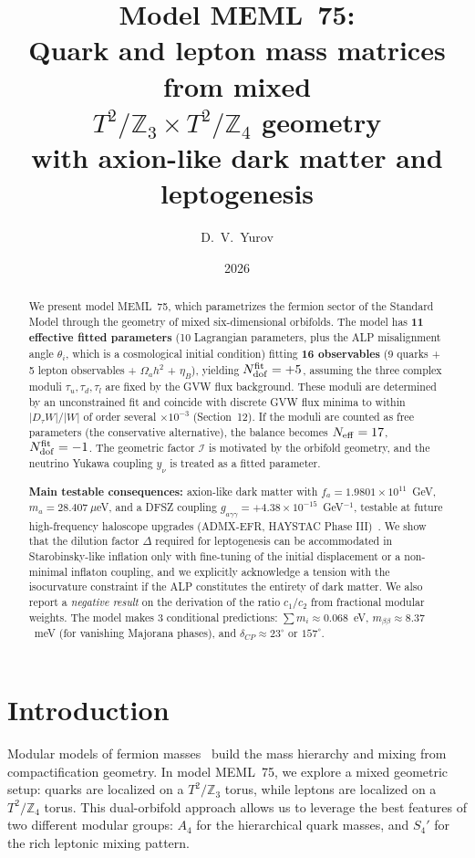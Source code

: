 \documentclass[12pt,a4paper]{article}
\title{\textbf{Model MEML~75:}\\[0.3cm]
\large Quark and lepton mass matrices from mixed \\
\(T^2/\mathbb{Z}_3 \times T^2/\mathbb{Z}_4\) geometry \\
with axion-like dark matter and leptogenesis}
\author{D.~V.~Yurov}
\date{2026}
\numberwithin{equation}{section}
\begin{document}
\maketitle

\begin{abstract}
\noindent
We present model MEML~75, which parametrizes the fermion sector of the Standard Model through the geometry of mixed six-dimensional orbifolds. The model has \textbf{11 effective fitted parameters} (10 Lagrangian parameters, plus the ALP misalignment angle \(\theta_i\), which is a cosmological initial condition) fitting \textbf{16 observables} (9 quarks + 5 lepton observables + \(\Omega_a h^2\) + \(\eta_B\)), yielding \(N_{\rm dof}^{\rm fit} = +5\), assuming the three complex moduli \(\tau_u, \tau_d, \tau_l\) are fixed by the GVW flux background. These moduli are determined by an unconstrained fit and coincide with discrete GVW flux minima to within \(|D_\tau W|/|W|\) of order several \(\times 10^{-3}\) (Section~12). If the moduli are counted as free parameters (the conservative alternative), the balance becomes \(N_{\rm eff} = 17\), \(N_{\rm dof}^{\rm fit} = -1\). The geometric factor \(\mathcal{I}\) is motivated by the orbifold geometry, and the neutrino Yukawa coupling \(y_\nu\) is treated as a fitted parameter.

\textbf{Main testable consequences:} axion-like dark matter with \(f_a = 1.9801\times 10^{11}\)~GeV, \(m_a = 28.407~\mu\)eV, and a DFSZ coupling \(g_{a\gamma\gamma} = +4.38 \times 10^{-15}\)~GeV\(^{-1}\), testable at future high-frequency haloscope upgrades (ADMX-EFR, HAYSTAC Phase III)~\cite{ADMX2018,HAYSTAC2021}. We show that the dilution factor \(\Delta\) required for leptogenesis can be accommodated in Starobinsky-like inflation only with fine-tuning of the initial displacement or a non-minimal inflaton coupling, and we explicitly acknowledge a tension with the isocurvature constraint if the ALP constitutes the entirety of dark matter. We also report a \emph{negative result} on the derivation of the ratio \(c_1/c_2\) from fractional modular weights. The model makes 3 conditional predictions: \(\sum m_i \approx 0.068\)~eV, \(m_{\beta\beta} \approx 8.37\)~meV (for vanishing Majorana phases), and \(\delta_{CP} \approx 23^\circ\) or \(157^\circ\).
\end{abstract}

\newpage

\section{Introduction}
Modular models of fermion masses~\cite{Feruglio2017,Kobayashi2019,Novichkov2019,Ding2021} build the mass hierarchy and mixing from compactification geometry. In model MEML~75, we explore a mixed geometric setup: quarks are localized on a \(T^2/\mathbb{Z}_3\) torus, while leptons are localized on a \(T^2/\mathbb{Z}_4\) torus. This dual-orbifold approach allows us to leverage the best features of two different modular groups: \(A_4\) for the hierarchical quark masses, and \(S_4'\) for the rich leptonic mixing pattern.
\end{document}
